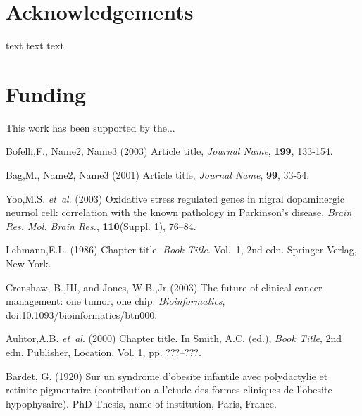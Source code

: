 \documentclass{bioinfo}
\begin{document}
\section*{Acknowledgements}

text text text\vspace*{-12pt}


\section*{Funding}

This work has been supported by the... \vspace*{-12pt}

%
%
%
%
%
%
%
%
%


\begin{thebibliography}{}

Bofelli,F., Name2, Name3 (2003) Article title, {\it Journal Name}, {\bf 199}, 133-154.

Bag,M., Name2, Name3 (2001) Article title, {\it Journal Name}, {\bf 99}, 33-54.

Yoo,M.S. \textit{et~al}. (2003) Oxidative stress regulated genes
in nigral dopaminergic neurnol cell: correlation with the known
pathology in Parkinson's disease. \textit{Brain Res. Mol. Brain
Res.}, \textbf{110}(Suppl. 1), 76--84.

Lehmann,E.L. (1986) Chapter title. \textit{Book Title}. Vol.~1, 2nd edn. Springer-Verlag, New York.

Crenshaw, B.,III, and Jones, W.B.,Jr (2003) The future of clinical
cancer management: one tumor, one chip. \textit{Bioinformatics},
doi:10.1093/bioinformatics/btn000.

Auhtor,A.B. \textit{et~al}. (2000) Chapter title. In Smith, A.C.
(ed.), \textit{Book Title}, 2nd edn. Publisher, Location, Vol. 1, pp.
???--???.

Bardet, G. (1920) Sur un syndrome d'obesite infantile avec
polydactylie et retinite pigmentaire (contribution a l'etude des
formes cliniques de l'obesite hypophysaire). PhD Thesis, name of
institution, Paris, France.

\end{thebibliography}
\end{document}
